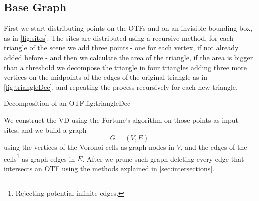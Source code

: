 \documentclass[dissertation.tex]{subfiles}
\begin{document}
\subsection{Base Graph}\label{sec:baseGraph}
First we
start distributing points on the \acp{OTF} and on
an invisible bounding box, as in \cref{fig:sites}.
The sites are distributed using a recursive method, for each triangle
of the scene we add three points - one for each
vertex, if not already added before - and then we calculate the area
of the triangle, if the area is bigger than a threshold we decompose
the triangle in four triangles adding three more vertices on the
midpoints of the edges of the original triangle as in
\cref{fig:triangleDec}, and repeating the process recursively for
each new triangle.
\begin{myfig}{Decomposition of an \ac{OTF}.}{fig:triangleDec}
\end{myfig}

We construct the \ac{VD} using the Fortune's algorithm
\cite{fortune} on
those points as input sites, and we build a graph
$$G=(V,E)$$
using the vertices
of the Voronoi cells as graph nodes in $V$, and the edges of the cells\footnote{Rejecting potential
  infinite edges.} as graph edges in $E$. After we prune such graph deleting every edge that
intersects an \ac{OTF} using the methods explained in \cref{sec:intersections}.
\end{document}
